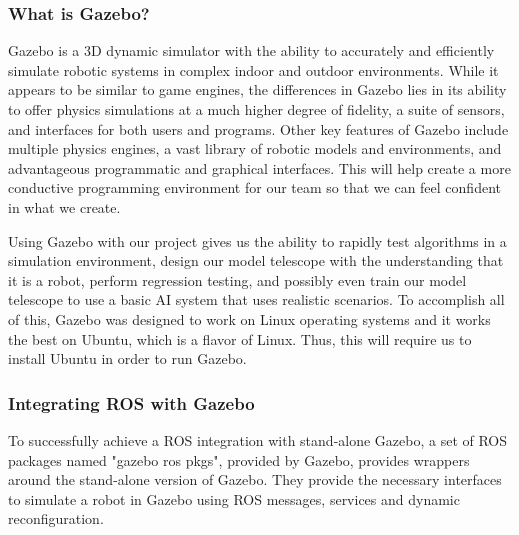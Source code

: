 \documentclass[12pt]{report}
\begin{document}
\subsubsection*{What is Gazebo?}

Gazebo is a 3D dynamic simulator with the ability to accurately and efficiently simulate robotic systems in complex indoor and outdoor environments. While it appears to be similar to game engines, the differences in Gazebo lies in its ability to offer physics simulations at a much higher degree of fidelity, a suite of sensors, and interfaces for both users and programs.\cite{GazeboDescription} Other key features of Gazebo include multiple physics engines, a vast library of robotic models and environments, and advantageous programmatic and graphical interfaces. This will help create a more conductive programming environment for our team so that we can feel confident in what we create. 

Using Gazebo with our project gives us the ability to rapidly test algorithms in a simulation environment, design our model telescope with the understanding that it is a robot, perform regression testing, and possibly even train our model telescope to use a basic AI system that uses realistic scenarios. To accomplish all of this, Gazebo was designed to work on Linux operating systems and it works the best on Ubuntu, which is a flavor of Linux. Thus, this will require us to install Ubuntu in order to run Gazebo. 

\subsubsection*{Integrating ROS with Gazebo}
To successfully achieve a ROS integration with stand-alone Gazebo, a set of ROS packages named "gazebo ros pkgs", provided by Gazebo, provides wrappers around the stand-alone version of Gazebo.\cite{GazeboRosIntegration} They provide the necessary interfaces to simulate a robot in Gazebo using ROS messages, services and dynamic reconfiguration. 

\printbibliography[title={References}]
\end{document}

